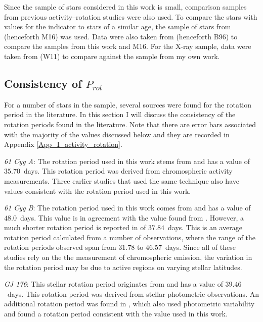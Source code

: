 Since the sample of stars considered in this work is small, comparison samples from previous activity--rotation studies were also used. To compare the stars with values for the \Rprime indicator to stars of a similar age, the sample of stars from \citet{Metcalfe_etal_2016} (henceforth M16) was used. Data were also taken from \citet{Baliunas_etal_1996} (henceforth B96) to compare the \Rprime samples from this work and M16. For the X-ray sample, data were taken from \citet{Wright_etal_2011} (W11) to compare against the sample from my own work.

\subsection{Consistency of \texorpdfstring{$P_{rot}$}{Prot}}
For a number of stars in the sample, several sources were found for the rotation period in the literature. In this section I will discuss the consistency of the rotation periods found in the literature. Note that there are error bars associated with the majority of the values discussed below and they are recorded in Appendix \ref{App_I_activity_rotation}.

\textit{61 Cyg A}: The rotation period used in this work stems from \citet{Boro_Saikia_etal_2016} and has a value of $35.70$~days. This rotation period was derived from chromospheric activity measurements. Three earlier studies that used the same technique \citep{Vaughan_etal_1981,Hallam_Wolff_1981,Donahue_etal_1996} also have values consistent with the rotation period used in this work.

\textit{61 Cyg B}: The rotation period used in this work comes from \citet{Vaughan_etal_1981} and has a value of $48.0$~days. This value is in agreement with the value found from \citet{Hallam_Wolff_1981}. However, a much shorter rotation period is reported in \citet{Donahue_etal_1996} of $37.84$~days. This is an average rotation period calculated from a number of observations, where the range of the rotation periods observed span from $31.78$ to $46.57$~days. Since all of these studies rely on the the measurement of chromospheric emission, the variation in the rotation period may be due to active regions on varying stellar latitudes.

\textit{GJ 176}: This stellar rotation period originates from \citet{Robertson_etal_2015_GJ176} and has a value of $39.46$~days. This rotation period was derived from stellar photometric observations. An additional rotation period was found in \citet{Kiraga_Stepien_2007}, which also used photometric variability and found a rotation period consistent with the value used in this work.

